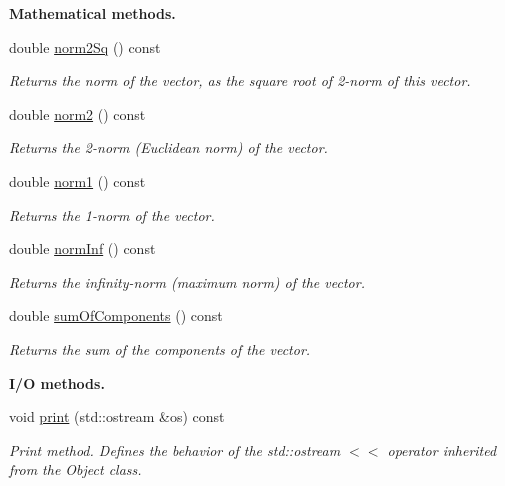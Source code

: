 \begin{Indent}{\bf Mathematical methods.}\par
\begin{DoxyCompactItemize}
\item 
double \hyperlink{class_q_u_e_s_o_1_1_gsl_vector_a185bf2c6caa7da0b3418e0c8d1014fdf}{norm2\-Sq} () const 
\begin{DoxyCompactList}\small\item\em Returns the norm of the vector, as the square root of 2-\/norm of this vector. \end{DoxyCompactList}\item 
double \hyperlink{class_q_u_e_s_o_1_1_gsl_vector_a3634fbeeda1a009cf14e3da4e56fc663}{norm2} () const 
\begin{DoxyCompactList}\small\item\em Returns the 2-\/norm (Euclidean norm) of the vector. \end{DoxyCompactList}\item 
double \hyperlink{class_q_u_e_s_o_1_1_gsl_vector_a53702fecb316dbf31a3f9b156111d500}{norm1} () const 
\begin{DoxyCompactList}\small\item\em Returns the 1-\/norm of the vector. \end{DoxyCompactList}\item 
double \hyperlink{class_q_u_e_s_o_1_1_gsl_vector_a46a3eabd6732f12ae8326764e3ef9921}{norm\-Inf} () const 
\begin{DoxyCompactList}\small\item\em Returns the infinity-\/norm (maximum norm) of the vector. \end{DoxyCompactList}\item 
double \hyperlink{class_q_u_e_s_o_1_1_gsl_vector_ad3fc6178cfa5c590e8bb241b791014f5}{sum\-Of\-Components} () const 
\begin{DoxyCompactList}\small\item\em Returns the sum of the components of the vector. \end{DoxyCompactList}\end{DoxyCompactItemize}
\end{Indent}
\begin{Indent}{\bf I/\-O methods.}\par
\begin{DoxyCompactItemize}
\item 
void \hyperlink{class_q_u_e_s_o_1_1_gsl_vector_ae0998a793ae43c6ac83fdc92c826f4b2}{print} (std\-::ostream \&os) const 
\begin{DoxyCompactList}\small\item\em Print method. Defines the behavior of the std\-::ostream $<$$<$ operator inherited from the Object class. \end{DoxyCompactList}\end{DoxyCompactItemize}
\end{Indent}
